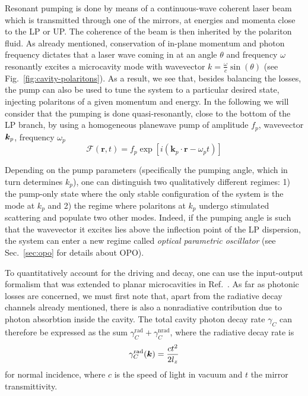 Resonant pumping is done by means of a continuous-wave coherent laser
beam which is transmitted through one of the mirrors, at energies and
momenta close to the LP or UP. The coherence of the beam is then
inherited by the polariton fluid.  As already mentioned, conservation
of in-plane momentum and photon frequency dictates that a laser wave
coming in at an angle $\theta$ and frequency $\omega$ resonantly
excites a microcavity mode with wavevector
$k = \frac{\omega}{c}\sin(\theta)$ (see
Fig.~\ref{fig:cavity-polaritons}). As a result, we see that, besides
balancing the losses, the pump can also be used to tune the system to
a particular desired state, injecting polaritons of a given momentum
and energy. In the following we will consider that the pumping is done
quasi-resonantly, close to the bottom of the LP branch, by using a
homogeneous planewave pump of amplitude $f_p$, wavevector $\bm{k}_p$,
frequency $\omega_p$
\begin{equation}\label{eq:pwpump}
  \mathcal{F}(\bm{r},t) = f_p \exp{\left[i (\bm{k}_p \cdot \bm{r} -
    \omega_p t)\right]}
\end{equation}

Depending on the pump parameters (specifically the pumping angle,
which in turn determines $k_p$), one can distinguish two qualitatively
different regimes: 1) the pump-only state where the only stable
configuration of the system is the mode at $k_p$ and 2) the regime
where polaritons at $k_p$ undergo stimulated scattering and populate
two other modes. Indeed, if the pumping angle is such that the
wavevector it excites lies above the inflection point of the LP
dispersion, the system can enter a new regime called \textit{optical
  parametric oscillator} (see Sec.~\ref{sec:opo} for details about
OPO).

To quantitatively account for the driving and decay, one can use
the input-output formalism that was extended to planar microcavities
in Ref.~\cite{Ciuti2006}. As far as photonic losses are concerned, we
must first note that, apart from the radiative decay channels already
mentioned, there is also a nonradiative contribution due to photon
absorbtion inside the cavity. The total cavity photon decay rate
$\gamma_C$ can therefore be expressed as the sum
$\gamma_C^{\text{rad}} + \gamma_C^{\text{nrad}}$, where the radiative
decay rate is~\cite{burstein2012confined,Carusotto_2013}
%
\begin{equation}\label{eq:rad-decay}
  \gamma_C^{\text{rad}}(\bm{k}) = \frac{ct^2}{2l_z}
\end{equation}
% 
for normal incidence, where $c$ is the speed of light in vacuum and $t$
the mirror transmittivity.


